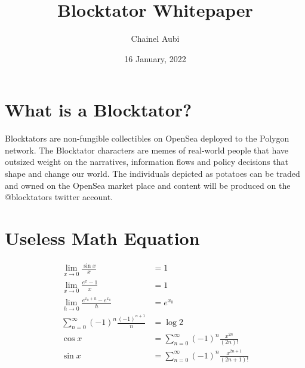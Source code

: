 \documentclass[a4paper,10pt]{article}
\begin{document}
\title{Blocktator Whitepaper}
\author{Chainel Aubi}
\date{16 January, 2022}

\section{What is a Blocktator?}
    \begin{minipage}[b]{1\linewidth}

        Blocktators are non-fungible collectibles on OpenSea deployed to the
        Polygon network. The Blocktator characters are memes of real-world
        people that have outsized weight on the narratives, information flows and
        policy decisions that shape and change our world. The individuals depicted
        as potatoes can be traded and owned on the OpenSea market place and content
        will be produced on the @blocktators twitter account.
    \end{minipage}


\section{Useless Math Equation}

    \begin{table}[ht]

        \hspace{0.1cm}
        \begin{minipage}[b]{1\linewidth}\centering
        \begin{align*}
            \lim_{x \to 0} \frac {\sin x}{x}  &= 1 \\
            \lim_{x \to 0} \frac {e^x - 1}{x} &= 1 \\
            \lim_{h \to 0} \frac {e^{{x_0} + h} - e^{x_0}}{h} &= e^{x_0} \\
            \sum_{n = 0}^{\infty} (-1)^n \frac {(-1)^{n + 1}}{n} &= \log 2 \\
            \cos x    &= \sum_{n = 0}^{\infty} (-1)^n \frac {x^{2n}}{(2n)!}  \\
            \sin x    &= \sum_{n = 0}^{\infty} (-1)^n \frac {x^{2n + 1}}{(2n + 1)!}
        \end{align*}
        \end{minipage}

    \end{table}
\end{document}
